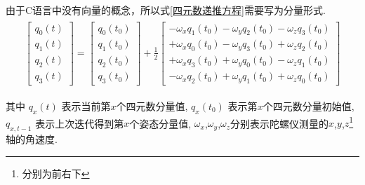 由于C语言中没有向量的概念，所以式\ref{四元数递推方程}需要写为分量形式\cite{飞行器专题资料}.
\begin{eqnarray}\label{四元数递推分量方程}
    \begin{split}
        \left[\begin{matrix}
                q_0(t) \\
                q_1(t) \\
                q_2(t) \\
                q_3(t)
        \end{matrix}\right]
        =
        \left[\begin{matrix}
                q_0(t_0) \\
                q_1(t_0) \\
                q_2(t_0) \\
                q_3(t_0)
        \end{matrix}\right]
        + 
        \frac{1}{2}
        \left[\begin{matrix}
                -\omega_x q_1(t_0)-\omega_y q_2(t_0)-\omega_z q_3(t_0) \\
                +\omega_x q_0(t_0)-\omega_y q_3(t_0)+\omega_z q_2(t_0) \\
                +\omega_x q_3(t_0)+\omega_y q_0(t_0)-\omega_z q_1(t_0) \\
                -\omega_x q_2(t_0)+\omega_y q_1(t_0)+\omega_z q_0(t_0) 
        \end{matrix}\right]
    \end{split}
\end{eqnarray} 

其中
$q_x(t)$        表示当前第$x$个四元数分量值,
$q_x(t_0)$      表示第$x$个四元数分量初始值,
$q_{x,t-1}$     表示上次迭代得到第$x$个姿态分量值,
$\omega_x$,$\omega_y$,$\omega_z$分别表示陀螺仪测量的$x$,$y$,$z$\footnote{分别为前右下}轴的角速度.

